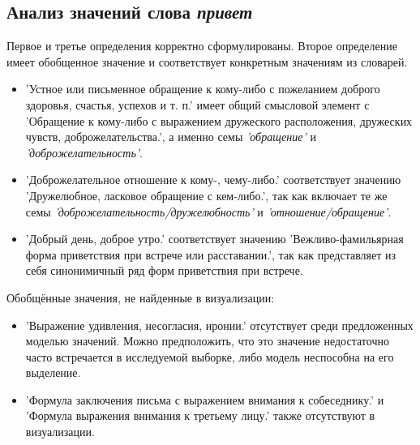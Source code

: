 \subsection*{Анализ значений слова \textit{привет}}

Первое и третье определения корректно сформулированы.
Второе определение имеет обобщенное значение и соответствует конкретным значениям из словарей.

\begin{itemize}
    \item ’Устное или письменное обращение к кому-либо с пожеланием доброго здоровья, счастья, успехов и т. п.’
имеет общий смысловой элемент с ’Обращение к кому-либо с выражением дружеского расположения,
дружеских чувств, доброжелательства.’, а именно семы \textit{’обращение’} и \textit{’доброжелательность’}.

    \item ’Доброжелательное отношение к кому-, чему-либо.’ соответствует значению
’Дружелюбное, ласковое обращение с кем-либо.’,
так как включает те же семы \textit{’доброжелательность/дружелюбность’} и \textit{’отношение/обращение’}.

    \item ’Добрый день, доброе утро.’ соответствует значению
’Вежливо-фамильярная форма приветствия при встрече или расставании.’,
так как представляет из себя синонимичный ряд форм приветствия при встрече.
\end{itemize}

Обобщённые значения, не найденные в визуализации:
\begin{itemize}
    \item ’Выражение удивления, несогласия, иронии.’ отсутствует среди предложенных моделью значений.
    Можно предположить, что это значение недостаточно часто встречается в исследуемой выборке,
либо модель неспособна на его выделение.

    \item ’Формула заключения письма с выражением внимания к собеседнику.’ и ’Формула выражения внимания к третьему лицу.’ также отсутствуют в визуализации.

%
\end{itemize}

